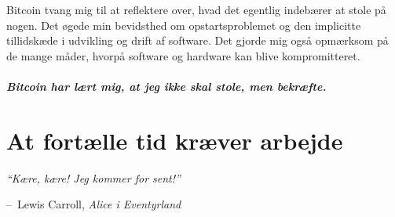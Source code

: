 \documentclass[paper=6in:9in,pagesize=pdftex,headinclude=on,footinclude=on,12pt]{scrbook}
\makeatletter
\newenvironment{chapquote}[2][4em]{\setlength{\@tempdima}{#1}%
   \def\chapquote@author{#2}%
   \parshape 1 \@tempdima \dimexpr\textwidth-2\@tempdima\relax%
   \itshape}{\par\normalfont\hfill--\ \chapquote@author\hspace*{\@tempdima}\par\bigskip}
\makeatother
\begin{document}
Bitcoin tvang mig til at reflektere over, hvad det egentlig indebærer at stole på nogen. Det øgede min bevidsthed om opstartsproblemet og den implicitte tillidskæde i udvikling og drift af software. Det gjorde mig også opmærksom på de mange måder, hvorpå software og hardware kan blive kompromitteret.\paragraph{Bitcoin har lært mig, at jeg ikke skal stole, men bekræfte.}%
%
%
%
%

\chapter{At fortælle tid kræver arbejde}
\label{les:17}

\begin{chapquote}{Lewis Carroll, \textit{Alice i Eventyrland}} \enquote{Kære, kære! Jeg kommer for sent!} \end{chapquote}
\end{document}
